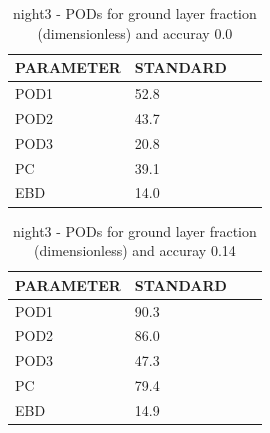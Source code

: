 \begin{table}[p!]
\begin{center}
\begin{tabular}{|l|l|l|l|}
\hline
\multicolumn{1}{|c|}{\cellcolor[HTML]{C0C0C0}\textbf{PARAMETER}} & \multicolumn{1}{c|}{\cellcolor[HTML]{C0C0C0}\textbf{STANDARD}} \\
\hline
\cellcolor[HTML]{C0C0C0}POD1  & 52.8                                \\
\cellcolor[HTML]{C0C0C0}POD2  & 43.7                                \\
\cellcolor[HTML]{C0C0C0}POD3  & 20.8                                \\
\cellcolor[HTML]{C0C0C0}PC    & 39.1                                  \\
\cellcolor[HTML]{C0C0C0}EBD   & 14.0                                 \\
\hline
\end{tabular}
\caption{night3 - PODs for ground layer fraction (dimensionless) and accuray 0.0}
\label{tab:podglf0.0:night3}
\end{center}
\end{table}
\begin{table}[p!]
\begin{center}
\begin{tabular}{|l|l|l|l|}
\hline
\multicolumn{1}{|c|}{\cellcolor[HTML]{C0C0C0}\textbf{PARAMETER}} & \multicolumn{1}{c|}{\cellcolor[HTML]{C0C0C0}\textbf{STANDARD}} \\
\hline
\cellcolor[HTML]{C0C0C0}POD1  & 90.3                                \\
\cellcolor[HTML]{C0C0C0}POD2  & 86.0                                \\
\cellcolor[HTML]{C0C0C0}POD3  & 47.3                                \\
\cellcolor[HTML]{C0C0C0}PC    & 79.4                                  \\
\cellcolor[HTML]{C0C0C0}EBD   & 14.9                                 \\
\hline
\end{tabular}
\caption{night3 - PODs for ground layer fraction (dimensionless) and accuray 0.14}
\label{tab:podglf0.14:night3}
\end{center}
\end{table}
